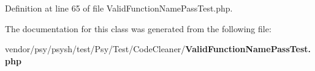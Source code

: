 Definition at line 65 of file Valid\+Function\+Name\+Pass\+Test.\+php.



The documentation for this class was generated from the following file\+:\begin{DoxyCompactItemize}
\item 
vendor/psy/psysh/test/\+Psy/\+Test/\+Code\+Cleaner/{\bf Valid\+Function\+Name\+Pass\+Test.\+php}\end{DoxyCompactItemize}
